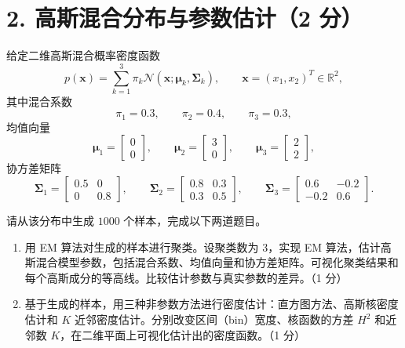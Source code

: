 \section*{2. 高斯混合分布与参数估计（2 分）}

给定二维高斯混合概率密度函数
\[
p(\mathbf{x})
=
\sum_{k=1}^{3}
\pi_k \mathcal{N}(\mathbf{x}; \boldsymbol{\mu}_k, \boldsymbol{\Sigma}_k),
\qquad
\mathbf{x}=(x_1,x_2)^T \in \mathbb{R}^2,
\]
其中混合系数
\[
\pi_1 = 0.3, \qquad \pi_2 = 0.4, \qquad \pi_3 = 0.3,
\]
均值向量
\[
\boldsymbol{\mu}_1 =
\begin{bmatrix}
0\\
0
\end{bmatrix},
\qquad
\boldsymbol{\mu}_2 =
\begin{bmatrix}
3\\
0
\end{bmatrix},
\qquad
\boldsymbol{\mu}_3 =
\begin{bmatrix}
2\\
2
\end{bmatrix},
\]
协方差矩阵
\[
\boldsymbol{\Sigma}_1 =
\begin{bmatrix}
0.5 & 0\\
0 & 0.8
\end{bmatrix},
\qquad
\boldsymbol{\Sigma}_2 =
\begin{bmatrix}
0.8 & 0.3\\
0.3 & 0.5
\end{bmatrix},
\qquad
\boldsymbol{\Sigma}_3 =
\begin{bmatrix}
0.6 & -0.2\\
-0.2 & 0.6
\end{bmatrix}.
\]

请从该分布中生成 $1000$ 个样本，完成以下两道题目。

\begin{enumerate}
    \item 用 EM 算法对生成的样本进行聚类。设聚类数为 $3$，实现 EM 算法，估计高斯混合模型参数，包括混合系数、均值向量和协方差矩阵。可视化聚类结果和每个高斯成分的等高线。比较估计参数与真实参数的差异。（1 分）

    \item 基于生成的样本，用三种非参数方法进行密度估计：直方图方法、高斯核密度估计和 $K$ 近邻密度估计。分别改变区间（bin）宽度、核函数的方差 $H^2$ 和近邻数 $K$，在二维平面上可视化估计出的密度函数。（1 分）
\end{enumerate}